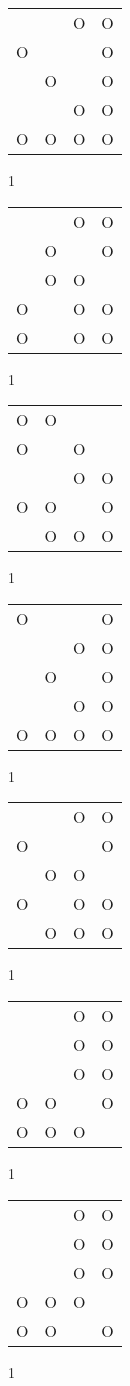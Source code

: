 \begin{tabular}{|m{0.2cm}m{0.2cm}m{0.2cm}m{0.2cm}|}\hline
 & &O&O\\
O& & &O\\
 &O& &O\\
 & &O&O\\
O&O&O&O\\
\hline\end{tabular}1
\begin{tabular}{|m{0.2cm}m{0.2cm}m{0.2cm}m{0.2cm}|}\hline
 & &O&O\\
 &O& &O\\
 &O&O& \\
O& &O&O\\
O& &O&O\\
\hline\end{tabular}1
\begin{tabular}{|m{0.2cm}m{0.2cm}m{0.2cm}m{0.2cm}|}\hline
O&O& & \\
O& &O& \\
 & &O&O\\
O&O& &O\\
 &O&O&O\\
\hline\end{tabular}1
\begin{tabular}{|m{0.2cm}m{0.2cm}m{0.2cm}m{0.2cm}|}\hline
O& & &O\\
 & &O&O\\
 &O& &O\\
 & &O&O\\
O&O&O&O\\
\hline\end{tabular}1
\begin{tabular}{|m{0.2cm}m{0.2cm}m{0.2cm}m{0.2cm}|}\hline
 & &O&O\\
O& & &O\\
 &O&O& \\
O& &O&O\\
 &O&O&O\\
\hline\end{tabular}1
\begin{tabular}{|m{0.2cm}m{0.2cm}m{0.2cm}m{0.2cm}|}\hline
 & &O&O\\
 & &O&O\\
 & &O&O\\
O&O& &O\\
O&O&O& \\
\hline\end{tabular}1
\begin{tabular}{|m{0.2cm}m{0.2cm}m{0.2cm}m{0.2cm}|}\hline
 & &O&O\\
 & &O&O\\
 & &O&O\\
O&O&O& \\
O&O& &O\\
\hline\end{tabular}1
